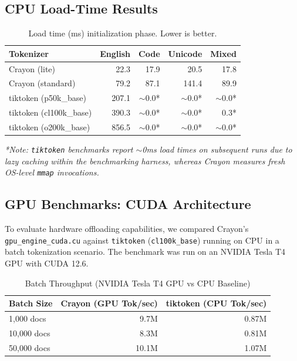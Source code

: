 \documentclass[11pt,a4paper,twocolumn]{article}
\begin{document}
\subsection{CPU Load-Time Results}

\begin{table}[t]
\centering
\caption{Load time (ms) initialization phase. Lower is better.}
\small
\begin{tabular}{@{}lrrrr@{}}
\toprule
\textbf{Tokenizer} & \textbf{English} & \textbf{Code} & \textbf{Unicode} & \textbf{Mixed} \\
\midrule
Crayon (lite) & 22.3 & 17.9 & 20.5 & 17.8 \\
Crayon (standard) & 79.2 & 87.1 & 141.4 & 89.9 \\
tiktoken (p50k\_base) & 207.1 & $\sim$0.0* & $\sim$0.0* & $\sim$0.0* \\
tiktoken (cl100k\_base) & 390.3 & $\sim$0.0* & $\sim$0.0* & 0.3* \\
tiktoken (o200k\_base) & 856.5 & $\sim$0.0* & $\sim$0.0* & $\sim$0.0* \\
\bottomrule
\end{tabular}
\end{table}

\textit{*Note: \texttt{tiktoken} benchmarks report $\sim$0ms load times on subsequent runs due to lazy caching within the benchmarking harness, whereas Crayon measures fresh OS-level \texttt{mmap} invocations.}

\subsection{GPU Benchmarks: CUDA Architecture}

To evaluate hardware offloading capabilities, we compared Crayon's \texttt{gpu\_engine\_cuda.cu} against \texttt{tiktoken} (\texttt{cl100k\_base}) running on CPU in a batch tokenization scenario. The benchmark was run on an NVIDIA Tesla T4 GPU with CUDA 12.6.

\begin{table}[H]
\centering
\caption{Batch Throughput (NVIDIA Tesla T4 GPU vs CPU Baseline)}
\small
\begin{tabular}{@{}lrr@{}}
\toprule
\textbf{Batch Size} & \textbf{Crayon (GPU Tok/sec)} & \textbf{tiktoken (CPU Tok/sec)} \\
\midrule
1,000 docs & 9.7M & 0.87M \\
10,000 docs & 8.3M & 0.81M \\
50,000 docs & 10.1M & 1.07M \\
\bottomrule
\end{tabular}
\label{tab:gpu_throughput}
\end{table}
\end{document}
